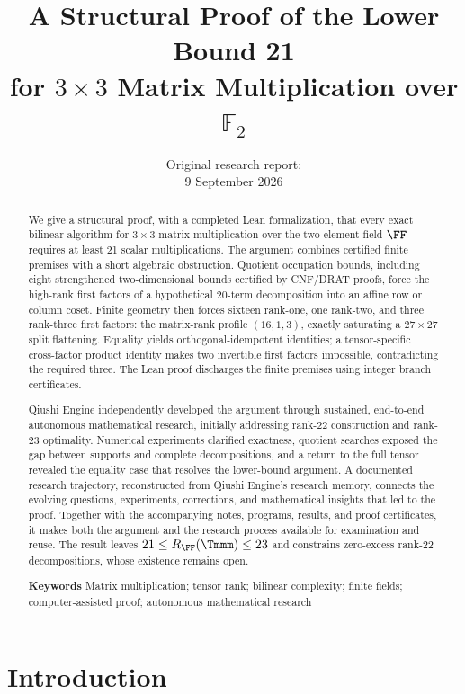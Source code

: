 \documentclass[11pt,a4paper]{article}
\title{A Structural Proof of the Lower Bound 21\\
for $3\times3$ Matrix Multiplication over $\mathbb{F}_2$}
\date{Original research report:\\9 September 2026}
\begin{document}
\maketitle
\thispagestyle{plain}
\begin{abstract}
We give a structural proof, with a completed Lean formalization, that every
exact bilinear algorithm for $3\times3$
matrix multiplication over the two-element field $\FF$ requires at least
21 scalar multiplications. The argument combines certified finite premises
with a short algebraic obstruction. Quotient occupation bounds, including
eight strengthened two-dimensional bounds certified by CNF/DRAT proofs,
force the high-rank first factors of a hypothetical 20-term decomposition
into an affine row or column coset. Finite geometry then forces sixteen
rank-one, one rank-two, and three rank-three first factors: the
matrix-rank profile $(16,1,3)$, exactly saturating a $27\times27$ split
flattening. Equality yields orthogonal-idempotent identities; a
tensor-specific cross-factor product identity makes two invertible first
factors impossible, contradicting the required three. The Lean proof
discharges the finite premises using integer branch certificates.

Qiushi Engine independently developed the argument through sustained,
end-to-end autonomous mathematical research, initially addressing rank-22
construction and rank-23 optimality.
Numerical experiments clarified exactness, quotient searches exposed the
gap between supports and complete decompositions, and a return to the
full tensor revealed the equality case that resolves the lower-bound
argument. A documented research trajectory, reconstructed from Qiushi
Engine's research memory, connects the evolving questions, experiments,
corrections, and mathematical insights that led to the proof.
Together with the accompanying notes, programs, results, and proof
certificates, it makes both the argument and the research process
available for examination and reuse. The result leaves
$21\le R_{\FF}(\Tmmm)\le23$ and constrains zero-excess rank-22
decompositions, whose existence remains open.
\par\smallskip\noindent\textbf{Keywords}\quad
Matrix multiplication; tensor rank; bilinear complexity; finite fields;
computer-assisted proof; autonomous mathematical research
\end{abstract}
{\tableofcontents\par}
\clearpage

\section{Introduction}
\end{document}

